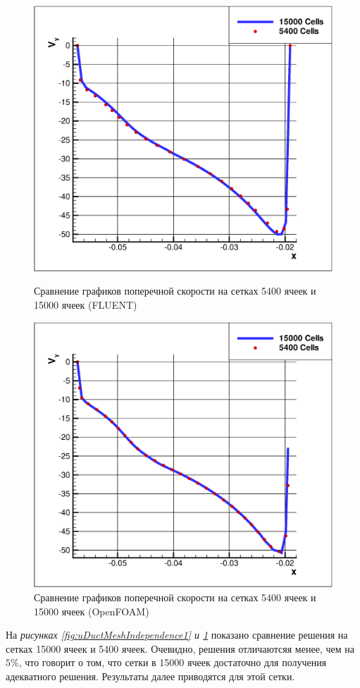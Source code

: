 \begin{figure}[ht]
	\begin{minipage}{0.475\linewidth}
		\includegraphics[scale=0.33]{uDuctMeshIndependence1}
		\caption{Сравнение графиков поперечной скорости на сетках 5400 ячеек и 15000 ячеек (FLUENT)}
		\label{fig:uDuctMeshIndependence1}
	\end{minipage}
	\hspace{0.5em}
	\begin{minipage}{0.475\linewidth}
		\includegraphics[scale=0.33]{uDuctMeshIndependence2}
		\caption{Сравнение графиков поперечной скорости на сетках 5400 ячеек и 15000 ячеек (OpenFOAM)}
		\label{fig:uDuctMeshIndependence2}
	\end{minipage}
\end{figure}
На \textit{рисунках \ref{fig:uDuctMeshIndependence1} и \ref{fig:uDuctMeshIndependence2}} показано сравнение решения на сетках 15000 ячеек и 5400 ячеек. Очевидно, решения отличаютсяя менее, чем на $5\%$, что говорит о том, что сетки в 15000 ячеек достаточно для получения адекватного решения. Результаты далее приводятся для этой сетки.

